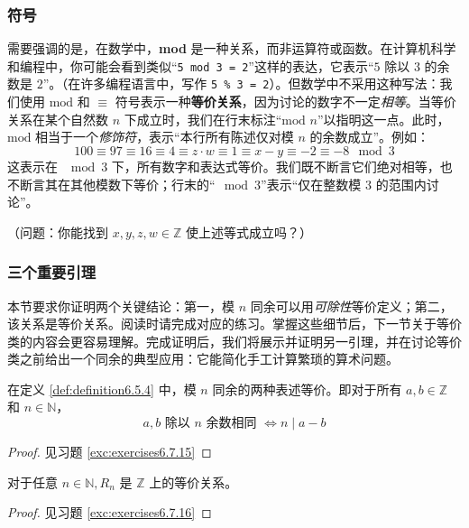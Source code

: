\subsubsection*{符号}

需要强调的是，在数学中，\textbf{mod} 是一种关系，而非运算符或函数。在计算机科学和编程中，你可能会看到类似``\verb|5 mod 3 = 2|''这样的表达，它表示``$5$ 除以 $3$ 的余数是 $2$''。（在许多编程语言中，写作 \verb|5 % 3 = 2|）。但数学中不采用这种写法：我们使用 $\text{mod}$ 和 $\equiv$ 符号表示一种\textbf{等价关系}，因为讨论的数字不一定\emph{相等}。当等价关系在某个自然数 $n$ 下成立时，我们在行末标注``$\text{mod\ } n$''以指明这一点。此时，$\text{mod}$ 相当于一个\emph{修饰符}，表示``本行所有陈述仅对模 $n$ 的余数成立''。例如：
\[100 \equiv 97 \equiv 16 \equiv 4 \equiv z \cdot w \equiv 1 \equiv x - y \equiv -2 \equiv -8 \mod 3\]
这表示在 $\mod 3$ 下，所有数字和表达式等价。我们既不断言它们绝对相等，也不断言其在其他模数下等价；行末的``$\mod 3$''表示``仅在整数模 $3$ 的范围内讨论''。

（问题：你能找到 $x, y, z, w \in \mathbb{Z}$ 使上述等式成立吗？）

\subsubsection*{三个重要引理}

本节要求你证明两个关键结论：第一，模 $n$ 同余可以用\emph{可除性}等价定义；第二，该关系是等价关系。阅读时请完成对应的练习。掌握这些细节后，下一节关于等价类的内容会更容易理解。完成证明后，我们将展示并证明另一引理，并在讨论等价类之前给出一个同余的典型应用：它能简化手工计算繁琐的算术问题。

\begin{lemma}\label{lemma6.5.8}
    在定义 \ref{def:definition6.5.4} 中，模 $n$ 同余的两种表述等价。即对于所有 $a, b \in \mathbb{Z}$ 和 $n \in \mathbb{N}$，
    \[a, b \text{\ 除以\ } n \text{\ 余数相同\ } \iff n \mid a - b\]
\end{lemma}

\begin{proof}
    见习题 \ref{exc:exercises6.7.15}
\end{proof}

\begin{lemma}\label{lemma6.5.9}
    对于任意 $n \in \mathbb{N}, R_n$ 是 $\mathbb{Z}$ 上的等价关系。
\end{lemma}

\begin{proof}
    见习题 \ref{exc:exercises6.7.16}
\end{proof}

